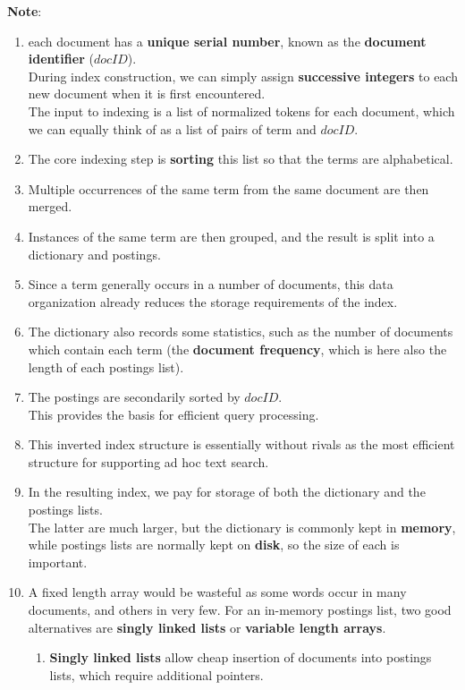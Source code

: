 \noindent\textbf{Note}:
\begin{enumerate}
    \item each document has a \textbf{unique serial number}, known as the \textbf{document identifier} ($docID$).\\
    During index construction, we can simply assign \textbf{successive integers} to each new document when it is first encountered.\\
    The input to indexing is a list of normalized tokens for each document, which we can equally think of as a list of pairs of term and $docID$.

    \item The core indexing step is \textbf{sorting} this list so that the terms are alphabetical.

    \item Multiple occurrences of the same term from the same document are then merged.

    \item Instances of the same term are then grouped, and the result is split into a dictionary and postings.

    \item Since a term generally occurs in a number of documents, this data organization already reduces the storage requirements of the index. 
    
    \item The dictionary also records some statistics, such as the number of documents which contain each term (the \textbf{document frequency}, which is here also the length of each postings list).

    \item The postings are secondarily sorted by $docID$.\\
    This provides the basis for efficient query processing.

    \item This inverted index structure is essentially without rivals as the most efficient structure for supporting ad hoc text search.

    \item In the resulting index, we pay for storage of both the dictionary and the postings lists.\\
    The latter are much larger, but the dictionary is commonly kept in \textbf{memory}, while postings lists are normally kept on \textbf{disk}, so the size of each is important.

    \item A fixed length array would be wasteful as some words occur in many documents, and others in very few. For an in-memory postings list, two good alternatives are \textbf{singly linked lists} or \textbf{variable length arrays}.
    \begin{enumerate}
        \item \textbf{Singly linked lists} allow cheap insertion of documents into postings lists, which require additional pointers.


\end{enumerate}
\end{enumerate}
